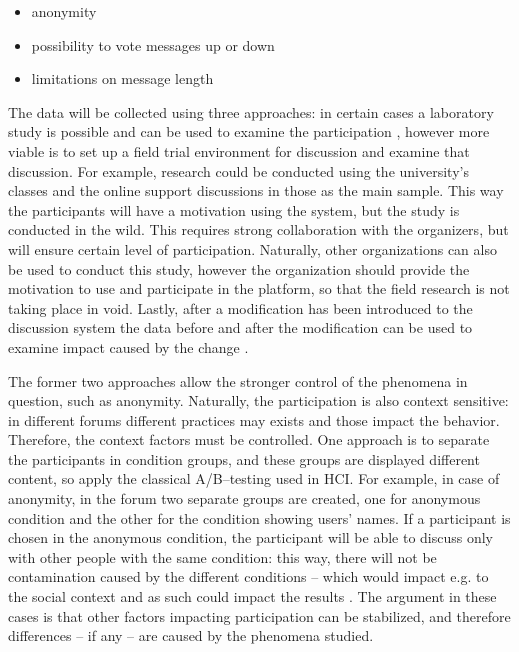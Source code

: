 \documentclass{article}
\begin{document}
\begin{itemize}
\item anonymity
\item possibility to vote messages up or down
\item limitations on message length
\end{itemize}

The data will be collected using three approaches: in certain cases a laboratory study is possible and can be used to examine the participation , however more viable is  to set up a field trial environment for discussion and examine that discussion. For example, research could be conducted using the university's classes and the online support discussions in those as the main sample. This way the participants will have a motivation using the system, but the study is conducted in the wild. This requires strong collaboration with the organizers, but will ensure certain level of participation. Naturally, other organizations can also be used to conduct this study, however the organization should provide the motivation to use and participate in the platform, so that the field research is not taking place in void. Lastly, after a modification has been introduced to the discussion system the data before and after the modification can be used to examine impact caused by the change .

The former two approaches allow the stronger control of the phenomena in question, such as anonymity. Naturally, the participation is also context sensitive: in different forums different practices may exists and those impact the behavior. Therefore, the context factors must be controlled. One approach is to separate the participants in condition groups, and these groups are displayed different content, so apply the classical A/B--testing used in HCI. For example, in case of anonymity, in the forum two separate groups are created, one for anonymous condition and the other for the condition showing users' names. If a participant is chosen in the anonymous condition, the participant will be able to discuss only with other people with the same condition: this way, there will not be contamination caused by the different conditions -- which would impact e.g. to the social context and as such could impact the results \cite{sukumaran11}. The argument in these cases is that other factors impacting participation can be stabilized, and therefore differences -- if any -- are caused by the phenomena studied.
\end{document}
